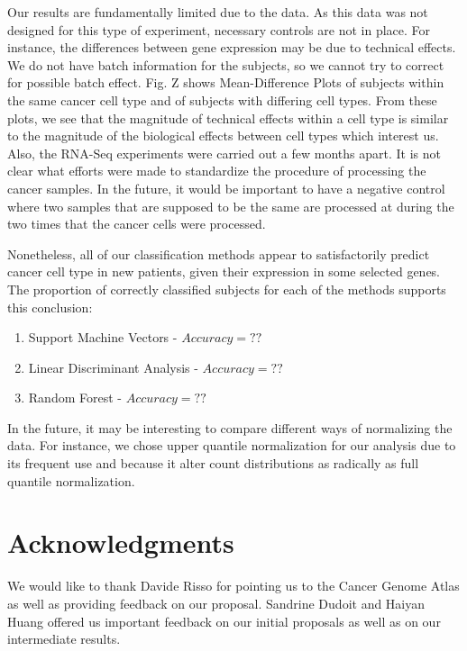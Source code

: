 Our results are fundamentally limited due to the data. As this data was not
designed for this type of experiment, necessary controls are not in place. For
instance, the differences between gene expression may be due to technical
effects. We do not have batch information for the subjects, so we cannot try 
to correct for possible batch effect. Fig. Z shows Mean-Difference Plots of
subjects within the same cancer cell type and of subjects with differing cell types.
From these plots, we see that the magnitude of technical effects within a cell type
is similar to the magnitude of the biological effects between cell types which interest
us. Also, the RNA-Seq experiments were 
carried out a few months apart. It is not clear what efforts were made to 
standardize the procedure of processing the cancer samples. In the future, 
it would be important to have a negative control where two samples that are 
supposed to be the same are processed at during the two times that the cancer 
cells were processed. 

Nonetheless, all of our classification methods appear to satisfactorily predict 
cancer cell type in new patients, given their expression in some selected genes.
The proportion of correctly classified subjects for each of the methods supports this conclusion:
\begin{enumerate}
\item Support Machine Vectors - $Accuracy = ??$
\item Linear Discriminant Analysis - $Accuracy = ??$
\item Random Forest - $Accuracy = ??$
\end{enumerate}

In the future,  it may be interesting to compare different ways of normalizing the data. For instance,
we chose upper quantile normalization for our analysis due to its frequent use and because it alter 
count distributions as radically as full quantile normalization.
\section*{Acknowledgments}

We would like to thank Davide Risso for pointing us to the Cancer Genome Atlas
as well as providing feedback on our proposal. Sandrine Dudoit and Haiyan Huang
offered us important feedback on our initial proposals as well as on our
intermediate results. 




